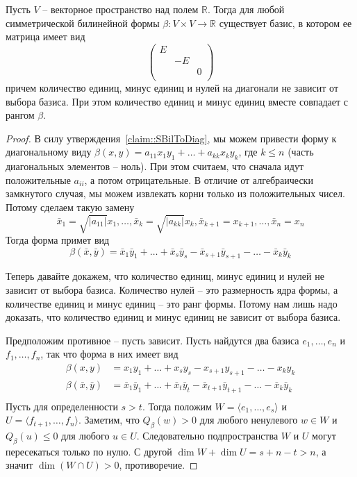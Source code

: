 \begin{claim}
\label{claim::SBilReal}
Пусть $V$ -- векторное пространство над полем $\mathbb R$.
Тогда для любой симметрической билинейной формы $\beta\colon V\times V\to \mathbb R$ существует базис, в котором ее матрица имеет вид
\[
\begin{pmatrix}
{E}&{}&{}\\
{}&{-E}&{}\\
{}&{}&{0}\\
\end{pmatrix}
\]
причем количество единиц, минус единиц и нулей на диагонали не зависит от выбора базиса.
При этом количество единиц и минус единиц вместе совпадает с рангом $\beta$.
\end{claim}
\begin{proof}
В силу утверждения~\ref{claim::SBilToDiag}, мы можем привести форму к диагональному виду $\beta(x,y) = a_{11}x_1 y_1 + \ldots + a_{kk}x_ky_k$, где $k\leqslant n$ (часть диагональных элементов -- ноль).
При этом считаем, что сначала идут положительные $a_{ii}$, а потом отрицательные.
В отличие от алгебраически замкнутого случая, мы можем извлекать корни только из положительных чисел.
Потому сделаем такую замену
\[
\bar x_1 = \sqrt{|a_{11}|} x_1,\ldots,\bar x_k = \sqrt{|a_{kk}|} x_k, \bar x_{k+1} = x_{k+1},\ldots,\bar x_n = x_n
\]
Тогда форма примет вид 
\[
\beta(\bar x,\bar y) = \bar x_1\bar y_1+\ldots +\bar x_s \bar y_s - \bar x_{s+1}\bar y_{s+1} - \ldots - \bar x_k \bar y_k
\]

Теперь давайте докажем, что количество единиц, минус единиц и нулей не зависит от выбора базиса.
Количество нулей -- это размерность ядра формы, а количестве единиц и минус единиц -- это ранг формы.
Потому нам лишь надо доказать, что количество единиц и минус единиц не зависит от выбора базиса.

Предположим противное -- пусть зависит.
Пусть найдутся два базиса $e_1,\ldots,e_n$ и $f_1,\ldots,f_n$, так что форма в них имеет вид
\begin{align*}
\beta(x, y) &= x_1y_1+\ldots +x_s y_s - x_{s+1}y_{s+1} - \ldots - x_k y_k\\
\beta(\bar x,\bar  y) &= \bar x_1\bar y_1+\ldots +\bar x_t \bar y_t - \bar x_{t+1}\bar y_{t+1} - \ldots - \bar x_k \bar y_k\\
\end{align*}
Пусть для определенности $s > t$.
Тогда положим $W = \langle e_1,\ldots, e_s\rangle$ и $U = \langle f_{t+1},\ldots, f_n\rangle$.
Заметим, что $Q_\beta(w) > 0$ для любого ненулевого $w\in W$ и $Q_\beta(u) \leqslant 0$ для любого $u\in U$.
Следовательно подпространства $W$ и $U$ могут пересекаться только по нулю.
С другой $\dim W+\dim U = s + n - t > n$, а значит $\dim(W\cap U) > 0$, противоречие.
\end{proof}

